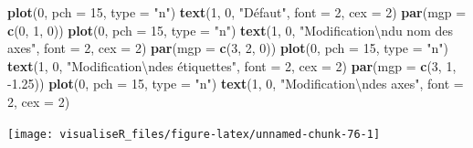 \documentclass[]{article}
\newenvironment{Shaded}{\begin{snugshade}}{\end{snugshade}}
\newcommand{\CharTok}[1]{\textcolor[rgb]{0.31,0.60,0.02}{#1}}
\newcommand{\DataTypeTok}[1]{\textcolor[rgb]{0.13,0.29,0.53}{#1}}
\newcommand{\DecValTok}[1]{\textcolor[rgb]{0.00,0.00,0.81}{#1}}
\newcommand{\FloatTok}[1]{\textcolor[rgb]{0.00,0.00,0.81}{#1}}
\newcommand{\KeywordTok}[1]{\textcolor[rgb]{0.13,0.29,0.53}{\textbf{#1}}}
\newcommand{\NormalTok}[1]{#1}
\newcommand{\StringTok}[1]{\textcolor[rgb]{0.31,0.60,0.02}{#1}}
\begin{document}
\begin{Shaded}
\begin{Highlighting}[]
\KeywordTok{plot}\NormalTok{(}\DecValTok{0}\NormalTok{, }\DataTypeTok{pch =} \DecValTok{15}\NormalTok{, }\DataTypeTok{type =} \StringTok{"n"}\NormalTok{)}
\KeywordTok{text}\NormalTok{(}\DecValTok{1}\NormalTok{, }\DecValTok{0}\NormalTok{, }\StringTok{"Défaut"}\NormalTok{, }\DataTypeTok{font =} \DecValTok{2}\NormalTok{, }\DataTypeTok{cex =} \DecValTok{2}\NormalTok{)}
\KeywordTok{par}\NormalTok{(}\DataTypeTok{mgp =} \KeywordTok{c}\NormalTok{(}\DecValTok{0}\NormalTok{, }\DecValTok{1}\NormalTok{, }\DecValTok{0}\NormalTok{))}
\KeywordTok{plot}\NormalTok{(}\DecValTok{0}\NormalTok{, }\DataTypeTok{pch =} \DecValTok{15}\NormalTok{, }\DataTypeTok{type =} \StringTok{"n"}\NormalTok{)}
\KeywordTok{text}\NormalTok{(}\DecValTok{1}\NormalTok{, }\DecValTok{0}\NormalTok{, }\StringTok{"Modification}\CharTok{\textbackslash{}n}\StringTok{du nom des axes"}\NormalTok{, }\DataTypeTok{font =} \DecValTok{2}\NormalTok{, }\DataTypeTok{cex =} \DecValTok{2}\NormalTok{)}
\KeywordTok{par}\NormalTok{(}\DataTypeTok{mgp =} \KeywordTok{c}\NormalTok{(}\DecValTok{3}\NormalTok{, }\DecValTok{2}\NormalTok{, }\DecValTok{0}\NormalTok{))}
\KeywordTok{plot}\NormalTok{(}\DecValTok{0}\NormalTok{, }\DataTypeTok{pch =} \DecValTok{15}\NormalTok{, }\DataTypeTok{type =} \StringTok{"n"}\NormalTok{)}
\KeywordTok{text}\NormalTok{(}\DecValTok{1}\NormalTok{, }\DecValTok{0}\NormalTok{, }\StringTok{"Modification}\CharTok{\textbackslash{}n}\StringTok{des étiquettes"}\NormalTok{, }\DataTypeTok{font =} \DecValTok{2}\NormalTok{, }\DataTypeTok{cex =} \DecValTok{2}\NormalTok{)}
\KeywordTok{par}\NormalTok{(}\DataTypeTok{mgp =} \KeywordTok{c}\NormalTok{(}\DecValTok{3}\NormalTok{, }\DecValTok{1}\NormalTok{, }\FloatTok{-1.25}\NormalTok{))}
\KeywordTok{plot}\NormalTok{(}\DecValTok{0}\NormalTok{, }\DataTypeTok{pch =} \DecValTok{15}\NormalTok{, }\DataTypeTok{type =} \StringTok{"n"}\NormalTok{)}
\KeywordTok{text}\NormalTok{(}\DecValTok{1}\NormalTok{, }\DecValTok{0}\NormalTok{, }\StringTok{"Modification}\CharTok{\textbackslash{}n}\StringTok{des axes"}\NormalTok{, }\DataTypeTok{font =} \DecValTok{2}\NormalTok{, }\DataTypeTok{cex =} \DecValTok{2}\NormalTok{)}
\end{Highlighting}
\end{Shaded}

\begin{center}\texttt{[image: visualiseR\_files/figure-latex/unnamed-chunk-76-1]} \end{center}
\end{document}

